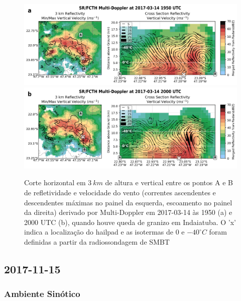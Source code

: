 \begin{figure}[hbt]
	\centering
	\caption{Corte horizontal em $3\:km$ de altura e vertical entre os pontos A e B de refletividade e velocidade do vento (correntes ascendentes e descendentes máximas no painel da esquerda, escoamento no painel da direita) derivado por Multi-Doppler em 2017-03-14 às 1950 (a) e 2000 UTC (b), quando houve queda de granizo em Indaiatuba. O 'x' indica a localização do hailpad e as isotermas de $0$ e $-40^{\circ}C$ foram definidas a partir da radiossondagem de SMBT} 
	\label{doppler_20170314_2}
	\vspace{-5pt}
	\includegraphics[width=\columnwidth]{../MultiDoppler_Processing/figures/SR-FCTH 2017-03-14 1950 UTC.png} \\
	\vspace{-5pt}
	\includegraphics[width=\columnwidth]{../MultiDoppler_Processing/figures/SR-FCTH 2017-03-14 2000 UTC.png} \\
\end{figure}

\subsection{2017-11-15}

\subsubsection{Ambiente Sinótico}\label{sinotica_20171115}

